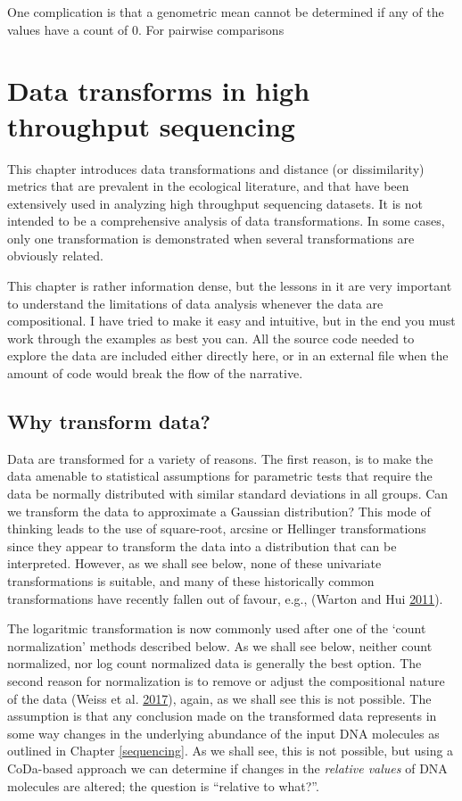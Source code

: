 \documentclass[onecolumn]{book}
\theoremstyle{definition}
\theoremstyle{definition}
\theoremstyle{definition}
\theoremstyle{remark}
\begin{document}
One complication is that a genometric mean cannot be determined if any
of the values have a count of 0. For pairwise comparisons

\hypertarget{transforms}{%
\chapter{Data transforms in high throughput
sequencing}\label{transforms}}

This chapter introduces data transformations and distance (or
dissimilarity) metrics that are prevalent in the ecological literature,
and that have been extensively used in analyzing high throughput
sequencing datasets. It is not intended to be a comprehensive analysis
of data transformations. In some cases, only one transformation is
demonstrated when several transformations are obviously related.

This chapter is rather information dense, but the lessons in it are very
important to understand the limitations of data analysis whenever the
data are compositional. I have tried to make it easy and intuitive, but
in the end you must work through the examples as best you can. All the
source code needed to explore the data are included either directly
here, or in an external file when the amount of code would break the
flow of the narrative.

\hypertarget{why-transform-data}{%
\section{Why transform data?}\label{why-transform-data}}

Data are transformed for a variety of reasons. The first reason, is to
make the data amenable to statistical assumptions for parametric tests
that require the data be normally distributed with similar standard
deviations in all groups. Can we transform the data to approximate a
Gaussian distribution? This mode of thinking leads to the use of
square-root, arcsine or Hellinger transformations since they appear to
transform the data into a distribution that can be interpreted. However,
as we shall see below, none of these univariate transformations is
suitable, and many of these historically common transformations have
recently fallen out of favour, e.g., (Warton and Hui
\protect\hyperlink{ref-Warton:2011aa}{2011}).

The logaritmic transformation is now commonly used after one of the
`count normalization' methods described below. As we shall see below,
neither count normalized, nor log count normalized data is generally the
best option. The second reason for normalization is to remove or adjust
the compositional nature of the data (Weiss et al.
\protect\hyperlink{ref-Weiss:2017aa}{2017}), again, as we shall see this
is not possible. The assumption is that any conclusion made on the
transformed data represents in some way changes in the underlying
abundance of the input DNA molecules as outlined in Chapter
\ref{sequencing}. As we shall see, this is not possible, but using a
CoDa-based approach we can determine if changes in the
\emph{relative values} of DNA molecules are altered; the question is
``relative to what?''.
\end{document}
